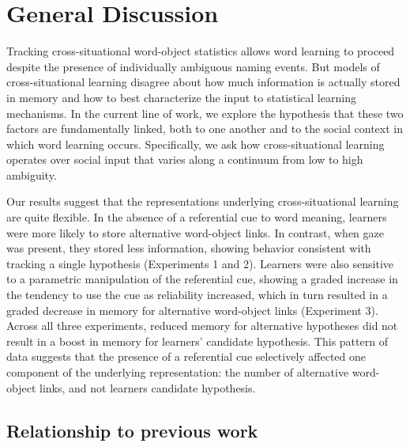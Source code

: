 \documentclass[authoryear, review]{elsarticle}
\begin{document}
\section{General Discussion}\label{general-discussion}

Tracking cross-situational word-object statistics allows word learning
to proceed despite the presence of individually ambiguous naming events.
But models of cross-situational learning disagree about how much
information is actually stored in memory and how to best characterize
the input to statistical learning mechanisms. In the current line of
work, we explore the hypothesis that these two factors are fundamentally
linked, both to one another and to the social context in which word
learning occurs. Specifically, we ask how cross-situational learning
operates over social input that varies along a continuum from low to
high ambiguity.

Our results suggest that the representations underlying
cross-situational learning are quite flexible. In the absence of a
referential cue to word meaning, learners were more likely to store
alternative word-object links. In contrast, when gaze was present, they
stored less information, showing behavior consistent with tracking a
single hypothesis (Experiments 1 and 2). Learners were also sensitive to
a parametric manipulation of the referential cue, showing a graded
increase in the tendency to use the cue as reliability increased, which
in turn resulted in a graded decrease in memory for alternative
word-object links (Experiment 3). Across all three experiments, reduced
memory for alternative hypotheses did not result in a boost in memory
for learners' candidate hypothesis. This pattern of data suggests that
the presence of a referential cue selectively affected one component of
the underlying representation: the number of alternative word-object
links, and not learners candidate hypothesis.

\subsection{Relationship to previous
work}\label{relationship-to-previous-work}
\end{document}
